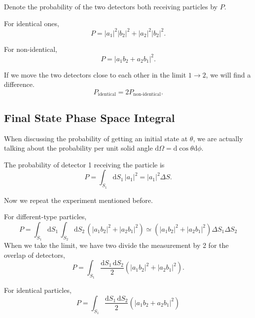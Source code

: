 Denote the probability of the two detectors both receiving particles by $P$.

For identical ones, 
\begin{equation}
  P = \left| a_1 \right| ^{2}\left| b_2 \right| ^{2}+\left| a_2 \right| ^{2} \left| b_2 \right| ^{2}.
\end{equation}

For non-identical,
\begin{equation}
    P = \left| a_1 b_2 + a_2 b_1\right| ^{2}.
\end{equation}

If we move the two detectors close to each other in the limit $1\to 2$, we will find a difference.
\begin{equation}
  P_{\text{identical}} = 2 P_{\text{non-identical}}.
\end{equation}

\subsection[末态相空间积分]{Final State Phase Space Integral}
When discussing the probability of getting an initial state at $\theta$, we are actually talking about the probability per unit solid angle $\mathrm{d} \Omega = \mathrm{d} \cos\theta \mathrm{d} \phi$.

The probability of detector 1 receiving the particle is
\begin{equation}
  P = \int_{S_1}^{} \mathrm{d}S_1 \, |a_1|^{2} = |a_1|^{2} \Delta S.
\end{equation}

Now we repeat the experiment mentioned before.

For different-type particles,
\begin{equation}
  P = \int_{S_1}^{} \mathrm{d}S_1 \, \int_{S_2}^{} \mathrm{d}S_2 \, \left( \left| a_1b_2 \right| ^{2} + \left| a_2 b_1 \right| ^{2} \right)   \simeq \left( \left| a_1b_2 \right| ^{2} + \left| a_2 b_1 \right| ^{2} \right) \Delta S_1 \Delta S_2
\end{equation}
When we take the limit, we have two divide the measurement by 2 for the overlap of detectors,
\begin{equation}
  P = \int_{S_1} \frac{\mathrm{d} S_1 \, \mathrm{d} S_2}{2} \left( \left| a_1b_2 \right| ^{2} + \left| a_2 b_1 \right| ^{2} \right).
\end{equation}

For identical particles,
\begin{equation}
  P = \int_{S_1} \frac{\mathrm{d} S_1\, \mathrm{d} S_2}{2} \left( \left| a_1b_2+a_2b_1 \right| ^{2} \right) 
\end{equation}

